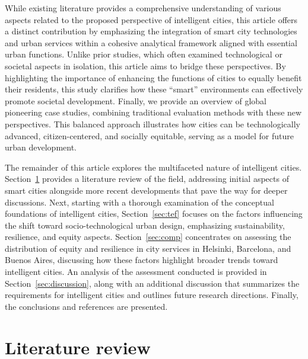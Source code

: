 \documentclass[smartcities,article,submit,pdftex,moreauthors]{Definitions/mdpi}
\begin{document}
While existing literature provides a comprehensive understanding of various aspects related to the proposed perspective of intelligent cities, this article offers a distinct contribution by emphasizing the integration of smart city technologies and urban services within a cohesive analytical framework aligned with essential urban functions. Unlike prior studies, which often examined technological or societal aspects in isolation, this article aims to bridge these perspectives. By highlighting the importance of enhancing the functions of cities to equally benefit their residents, this study clarifies how these ``smart'' environments can effectively promote societal development. Finally, we provide an overview of global pioneering case studies, combining traditional evaluation methods with these new perspectives. This balanced approach illustrates how cities can be technologically advanced, citizen-centered, and socially equitable, serving as a model for future urban development.

The remainder of this article explores the multifaceted nature of intelligent cities. Section~\ref{review} provides a literature review of the field, addressing initial aspects of smart cities alongside more recent developments that pave the way for deeper discussions. Next, starting with a thorough examination of the conceptual foundations of intelligent cities, Section~\ref{sec:tef} focuses on the factors influencing the shift toward socio-technological urban design, emphasizing sustainability, resilience, and equity aspects. Section~\ref{sec:comp} concentrates on assessing the distribution of equity and resilience in city services in Helsinki, Barcelona, and Buenos Aires, discussing how these factors highlight broader trends toward intelligent cities. An analysis of the assessment conducted is provided in Section~\ref{sec:discussion}, along with an additional discussion that summarizes the requirements for intelligent cities and outlines future research directions. Finally, the conclusions and references are presented.

\section{Literature review}
\label{review}
\end{document}
